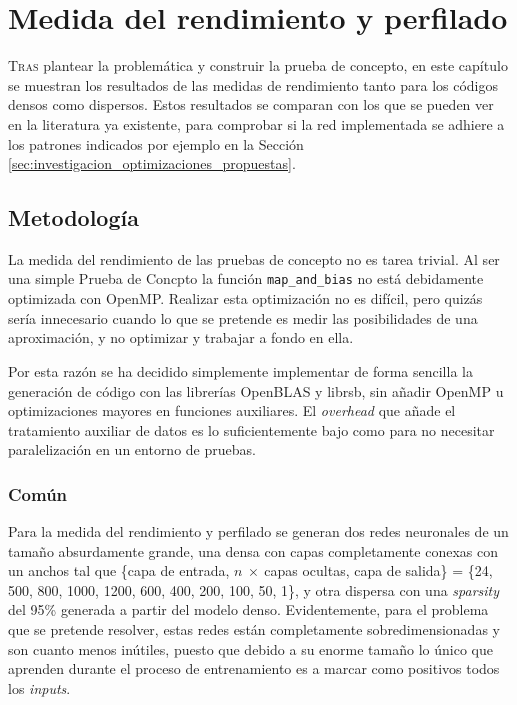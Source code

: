 \chapter{Medida del rendimiento y perfilado}
\label{chap:medida_rendimiento_perfilado}

\lettrine{T}{ras} plantear la problemática y construir la prueba de concepto, en este capítulo se muestran los resultados de las medidas de rendimiento tanto para los códigos densos como dispersos. Estos resultados se comparan con los que se pueden ver en la literatura ya existente, para comprobar si la red implementada se adhiere a los patrones indicados por ejemplo en la Sección \ref{sec:investigacion_optimizaciones_propuestas}.

\section{Metodología}
\label{sec:metodologia}
La medida del rendimiento de las pruebas de concepto no es tarea trivial. Al ser una simple Prueba de Concpto la función \texttt{map\_and\_bias} no está debidamente optimizada con OpenMP. Realizar esta optimización no es difícil, pero quizás sería innecesario cuando lo que se pretende es medir las posibilidades de una aproximación, y no optimizar y trabajar a fondo en ella.

Por esta razón se ha decidido simplemente implementar de forma sencilla la generación de código con las librerías OpenBLAS y librsb, sin añadir OpenMP u optimizaciones mayores en funciones auxiliares. El \textit{overhead} que añade el tratamiento auxiliar de datos es lo suficientemente bajo como para no necesitar paralelización en un entorno de pruebas.

\subsection{Común}
\label{ssec:comun_metodologia}
Para la medida del rendimiento y perfilado se generan dos redes neuronales de un tamaño absurdamente grande, una densa con capas completamente conexas con un anchos tal que \{capa de entrada, $n\:\times\:$capas ocultas, capa de salida\} = \{24, 500, 800, 1000, 1200, 600, 400, 200, 100, 50, 1\}, y otra dispersa con una \textit{sparsity} del 95\% generada a partir del modelo denso. Evidentemente, para el problema que se pretende resolver, estas redes están completamente sobredimensionadas y son cuanto menos inútiles, puesto que debido a su enorme tamaño lo único que aprenden durante el proceso de entrenamiento es a marcar como positivos todos los \textit{inputs}.

